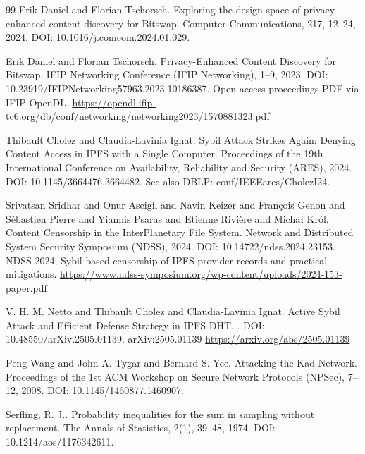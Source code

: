 \documentclass[11pt]{article}
\begin{document}
\begin{thebibliography}{99}
Erik Daniel and Florian Tschorsch.
\newblock Exploring the design space of privacy-enhanced content discovery for Bitswap.
\newblock Computer Communications, 217, 12--24, 2024.
\newblock DOI: 10.1016/j.comcom.2024.01.029.

Erik Daniel and Florian Tschorsch.
\newblock Privacy-Enhanced Content Discovery for {Bitswap}.
\newblock IFIP Networking Conference (IFIP Networking), 1--9, 2023.
\newblock DOI: 10.23919/IFIPNetworking57963.2023.10186387.
\newblock Open-access proceedings PDF via IFIP OpenDL.
\newblock \url{https://opendl.ifip-tc6.org/db/conf/networking/networking2023/1570881323.pdf}

Thibault Cholez and Claudia-Lavinia Ignat.
\newblock Sybil Attack Strikes Again: Denying Content Access in {IPFS} with a Single Computer.
\newblock Proceedings of the 19th International Conference on Availability, Reliability and Security (ARES), 2024.
\newblock DOI: 10.1145/3664476.3664482.
\newblock See also DBLP: conf/IEEEares/CholezI24.

Srivatsan Sridhar and Onur Ascigil and Navin Keizer and Fran{\c{c}}ois Genon and S{\'e}bastien Pierre and Yiannis Psaras and Etienne Rivi{\`e}re and Micha{\l} Kr{\'o}l.
\newblock Content Censorship in the InterPlanetary File System.
\newblock Network and Distributed System Security Symposium (NDSS), 2024.
\newblock DOI: 10.14722/ndss.2024.23153.
\newblock NDSS 2024; Sybil-based censorship of IPFS provider records and practical mitigations.
\newblock \url{https://www.ndss-symposium.org/wp-content/uploads/2024-153-paper.pdf}

V. H. M. Netto and Thibault Cholez and Claudia-Lavinia Ignat.
\newblock Active Sybil Attack and Efficient Defense Strategy in {IPFS} {DHT}.
.
\newblock DOI: 10.48550/arXiv.2505.01139.
\newblock arXiv:2505.01139
\newblock \url{https://arxiv.org/abs/2505.01139}

Peng Wang and John A. Tygar and Bernard S. Yee.
\newblock Attacking the {Kad} Network.
\newblock Proceedings of the 1st ACM Workshop on Secure Network Protocols (NPSec), 7--12, 2008.
\newblock DOI: 10.1145/1460877.1460907.

Serfling, R. J..
\newblock Probability inequalities for the sum in sampling without replacement.
\newblock The Annals of Statistics, 2(1), 39--48, 1974.
\newblock DOI: 10.1214/aos/1176342611.


\end{thebibliography}
\end{document}
